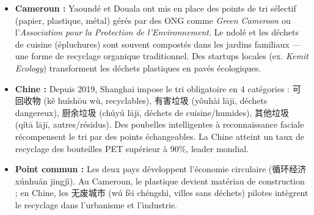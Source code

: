 \documentclass[11pt]{article}
\newcommand{\cle}[1]{{\popxbold\color{popdark}#1}}
\begin{document}
\begin{savaistu}
\begin{itemize}
\item \textbf{Cameroun :} Yaoundé et Douala ont mis en place des points de tri sélectif (papier, plastique, métal) gérés par des ONG comme \emph{Green Cameroon} ou l'\emph{Association pour la Protection de l'Environnement}. Le \cle{ndolé} et les déchets de cuisine (épluchures) sont souvent compostés dans les jardins familiaux — une forme de recyclage organique traditionnel. Des startups locales (ex. \emph{Kemit Ecology}) transforment les déchets plastiques en pavés écologiques.
\item \textbf{Chine :} Depuis 2019, Shanghai impose le tri obligatoire en 4 catégories : \cle{可回收物} (kě huíshōu wù, recyclables), \cle{有害垃圾} (yǒuhài lājī, déchets dangereux), \cle{厨余垃圾} (chúyú lājī, déchets de cuisine/humides), \cle{其他垃圾} (qítā lājī, autres/résidus). Des poubelles intelligentes à reconnaissance faciale récompensent le tri par des points échangeables. La Chine atteint un taux de recyclage des bouteilles PET supérieur à 90\%, leader mondial.
\item \textbf{Point commun :} Les deux pays développent l'économie circulaire (\cle{循环经济} xúnhuán jīngjì). Au Cameroun, le plastique devient matériau de construction ; en Chine, les \cle{无废城市} (wú fèi chéngshì, villes sans déchets) pilotes intègrent le recyclage dans l'urbanisme et l'industrie.
\end{itemize}
\end{savaistu}
\end{document}

